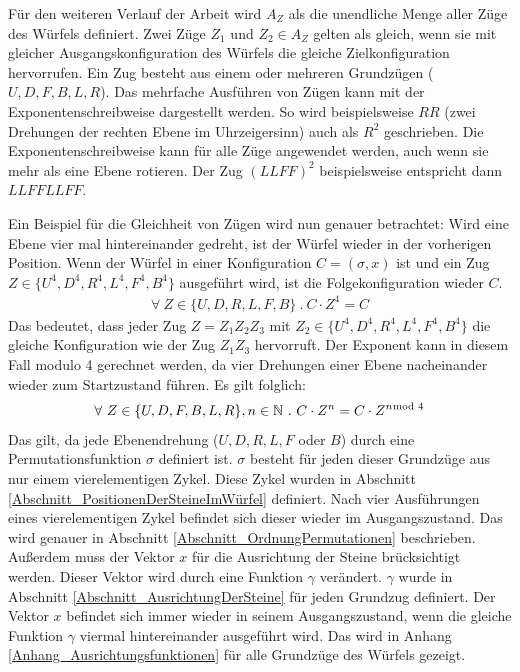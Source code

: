 \documentclass[12pt,a4paper, usenames, dvipsnames]{article}
\theoremstyle{mystyle}
\theoremstyle{definition}
\begin{document}
Für den weiteren Verlauf der Arbeit wird $A_Z$ als die unendliche Menge aller Züge des Würfels definiert. Zwei Züge $Z_1$ und $Z_2 \in A_Z$ gelten als gleich, wenn sie mit gleicher Ausgangskonfiguration des Würfels die gleiche Zielkonfiguration hervorrufen. 
Ein Zug besteht aus einem oder mehreren Grundzügen ($U, D, F, B, L, R$).
Das mehrfache Ausführen von Zügen kann mit der Exponentenschreibweise dargestellt werden. So wird beispielsweise $RR$ (zwei Drehungen der rechten Ebene im Uhrzeigersinn) auch als $R^2$ geschrieben. Die Exponentenschreibweise kann für alle Züge angewendet werden, auch wenn sie mehr als eine Ebene rotieren. Der Zug $(LLFF)^2$ beispielsweise entspricht dann $LLFFLLFF$. 

Ein Beispiel für die Gleichheit von Zügen wird nun genauer betrachtet: Wird eine Ebene vier mal hintereinander gedreht, ist der Würfel wieder in der vorherigen Position. Wenn der Würfel in einer Konfiguration $C = (\sigma, x)$ ist und ein Zug $Z \in \{ U^4, D^4, R^4, L^4, F^4, B^4\}$ ausgeführt wird, ist die Folgekonfiguration wieder $C$.
\begin{align*}
\forall \ Z \in \{ U, D, R, L, F, B\} \ . \ C \cdot Z^4 = C  
\end{align*}
Das bedeutet, dass jeder Zug $Z = Z_1Z_2Z_3$ mit $Z_2 \in \{ U^4, D^4, R^4, L^4, F^4, B^4\}$ die gleiche Konfiguration wie der Zug $Z_1Z_3$ hervorruft.
Der Exponent kann in diesem Fall modulo 4 gerechnet werden, da vier Drehungen einer Ebene nacheinander wieder zum Startzustand führen. 
Es gilt folglich:
\begin{align*}
\forall \  Z \in \{U, D, F, B, L, R\}, n \in \mathbb{N} \ . \ C \cdot Z^n= C \cdot Z^{n \hspace*{-0.5em} \mod 4}
\end{align*}
Das gilt, da jede Ebenendrehung ($U, D, R, L, F$ oder $B$) durch eine Permutationsfunktion $\sigma$ definiert ist. $\sigma$ besteht für jeden dieser Grundzüge aus nur einem vierelementigen Zykel. Diese Zykel wurden in Abschnitt \ref{Abschnitt_PositionenDerSteineImWürfel} definiert. Nach vier Ausführungen eines vierelementigen Zykel befindet sich dieser wieder im Ausgangszustand. Das wird genauer in Abschnitt \ref{Abschnitt_OrdnungPermutationen} beschrieben. Außerdem muss der Vektor $x$ für die Ausrichtung der Steine brücksichtigt werden. Dieser Vektor wird durch eine Funktion $\gamma$ verändert. $\gamma$ wurde in Abschnitt \ref{Abschnitt_AusrichtungDerSteine} für jeden Grundzug definiert. Der Vektor $x$ befindet sich immer wieder in seinem Ausgangszustand, wenn die gleiche Funktion $\gamma$ viermal hintereinander ausgeführt wird. Das wird in Anhang \ref{Anhang_Ausrichtungsfunktionen} für alle Grundzüge des Würfels gezeigt.
\end{document}

